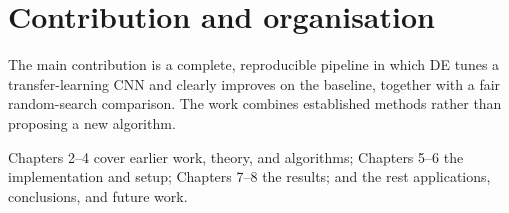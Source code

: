 \section{Contribution and organisation}
The main contribution is a complete, reproducible pipeline in which DE tunes a transfer-learning CNN and clearly improves on the baseline, together with a fair random-search comparison. The work combines established methods rather than proposing a new algorithm.

Chapters 2--4 cover earlier work, theory, and algorithms; Chapters 5--6 the implementation and setup; Chapters 7--8 the results; and the rest applications, conclusions, and future work.
